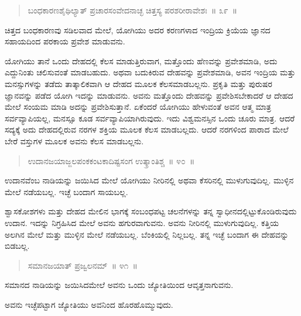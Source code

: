 \vspace{-0.3cm}

\begin{verse}
ಬಂಧಕಾರಣಶೈಥಿಲ್ಯಾತ್​ ಪ್ರಚಾರಸಂವೇದನಾಚ್ಛ ಚಿತ್ತಸ್ಯ ಪರಶರೀರಾವೇಶಃ~॥ ೩೯~॥
\end{verse}

\vspace{-0.3cm}

ಚಿತ್ತದ ಬಂಧಕಾರಣವು ಸಡಿಲವಾದ ಮೇಲೆ, ಯೋಗಿಯು ಅದರ ಕರಣಗಳಾದ ಇಂದ್ರಿಯ ಕ್ರಿಯೆಯ ಜ್ಞಾನದ ಸಹಾಯದಿಂದ ಪರಕಾಯ ಪ್ರವೇಶ ಮಾಡುವನು. 

ಯೋಗಿಯು ತಾನೆ ಒಂದು ದೇಹದಲ್ಲಿ ಕೆಲಸ ಮಾಡುತ್ತಿರುವಾಗ, ಮತ್ತೊಂದು ಹೆಣವನ್ನು ಪ್ರವೇಶಮಾಡಿ, ಅದು ಎದ್ದುನಿಂತು ಚಲಿಸುವಂತೆ ಮಾಡಬಹುದು. ಅಥವಾ ಬದುಕಿರುವ ದೇಹವನ್ನು ಪ್ರವೇಶಮಾಡಿ, ಅವನ ಇಂದ್ರಿಯ ಮತ್ತು ಮನಸ್ಸುಗಳನ್ನು ತಡೆದು ತಾತ್ಕಾಲಿಕವಾಗಿ ಆ ದೇಹದ ಮೂಲಕ ಕೆಲಸಮಾಡಬಲ್ಲನು. ಪ್ರಕೃತಿ ಮತ್ತು ಪುರುಷರ ಜ್ಞಾನವನ್ನು ಪಡೆದ ಯೋಗಿ ಇದನ್ನು ಮಾಡುವನು. ಅವನು ಮತ್ತೊಂದು ದೇಹವನ್ನು ಪ್ರವೇಶಿಸಬೇಕಾದರೆ ಆ ದೇಹದ ಮೇಲೆ ಸಂಯಮ ಮಾಡಿ ಅದನ್ನು ಪ್ರವೇಶಿಸುತ್ತಾನೆ. ಏಕೆಂದರೆ ಯೋಗಿಯು ಹೇಳುವಂತೆ ಅವನ ಆತ್ಮ ಮಾತ್ರ ಸರ್ವವ್ಯಾಪಿಯಲ್ಲ, ಮನಸ್ಸೂ ಕೂಡ ಸರ್ವವ್ಯಾಪಿಯಾಗಿರುವುದು. ಇದು ವಿಶ್ವಮನಸ್ಸಿನ ಒಂದು ಚೂರು ಮಾತ್ರ. ಆದರೆ ಸದ್ಯಕ್ಕೆ ಅದು ದೇಹದಲ್ಲಿರುವ ನರಗಳ ಶಕ್ತಿಯ ಮೂಲಕ ಕೆಲಸ ಮಾಡಬಲ್ಲದು. ಆದರೆ ನರಗಳಿಂದ ಪಾರಾದ ಮೇಲೆ ಬೇರೆ ವಸ್ತುಗಳ ಮೂಲಕ ಅವನು ಕೆಲಸ ಮಾಡಬಲ್ಲನು. 

\vspace{-0.3cm}

\begin{verse}
ಉದಾನಜಯಾಜ್ಜಲಪಂಕಕಂಟಕಾದಿಷ್ಟಸಂಗ ಉತ್ಕ್ರಾಂತಿಶ್ಚ~॥ ೪೦~॥
\end{verse}

\vspace{-0.3cm}

ಉದಾನವೆಂಬ ನಾಡಿಯನ್ನು ಜಯಿಸಿದ ಮೇಲೆ ಯೋಗಿಯು ನೀರಿನಲ್ಲಿ ಅಥವಾ ಕೆಸರಿನಲ್ಲಿ ಮುಳುಗುವುದಿಲ್ಲ. ಮುಳ್ಳಿನ ಮೇಲೆ ನಡೆಯಬಲ್ಲ. ಇಚ್ಛೆ ಬಂದಾಗ ಸಾಯಬಲ್ಲ. 

ಶ್ವಾಸಕೋಶಗಳು ಮತ್ತು ದೇಹದ ಮೇಲಿನ ಭಾಗಕ್ಕೆ ಸಂಬಂಧಪಟ್ಟ ಚಲನೆಗಳನ್ನು ತನ್ನ ಸ್ವಾಧೀನದಲ್ಲಿಟ್ಟುಕೊಂಡಿರುವುದು ಉದಾನ. ಇದನ್ನು ನಿಗ್ರಹಿಸಿದ ಮೇಲೆ ಅವನು ಹಗುರವಾಗುವನು. ಅವನು ನೀರಿನಲ್ಲಿ ಮುಳುಗುವುದಿಲ್ಲ. ಕತ್ತಿಯ ಅಲಗಿನ ಮೇಲೆ ಮತ್ತು ಮುಳ್ಳಿನ ಮೇಲೆ ನಡೆಯಬಲ್ಲ. ಬೆಂಕಿಯಲ್ಲಿ ನಿಲ್ಲಬಲ್ಲ. ತನ್ನ ಇಚ್ಛೆ ಬಂದಾಗ ಈ ದೇಹವನ್ನು ಬಿಡಬಲ್ಲ. 

\vspace{-0.3cm}

\begin{verse}
ಸಮಾನಜಯಾತ್​ ಪ್ರಜ್ವಲನಮ್​~॥ ೪೧~॥
\end{verse}

\vspace{-0.3cm}

ಸಮಾನದ ನಾಡಿಯನ್ನು ಜಯಿಸಿದಮೇಲೆ ಅವನು ಒಂದು ಜ್ಯೋತಿಯಿಂದ ಆವೃತ್ತನಾಗುವನು. 

ಅವನು ಇಚ್ಛೆಪಟ್ಟಾಗ ಜ್ಯೋತಿಯು ಅವನಿಂದ ಹೊರಹೊಮ್ಮುವುದು. 

